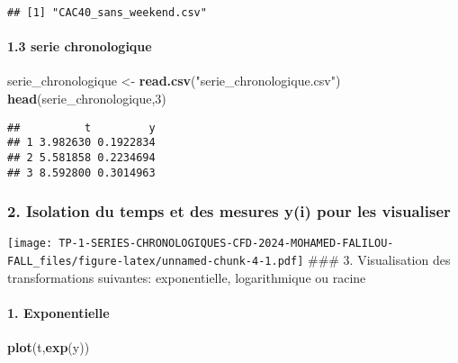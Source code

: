 \documentclass[
]{article}
\newenvironment{Shaded}{\begin{snugshade}}{\end{snugshade}}
\newcommand{\DecValTok}[1]{\textcolor[rgb]{0.00,0.00,0.81}{#1}}
\newcommand{\FunctionTok}[1]{\textcolor[rgb]{0.13,0.29,0.53}{\textbf{#1}}}
\newcommand{\NormalTok}[1]{#1}
\newcommand{\OtherTok}[1]{\textcolor[rgb]{0.56,0.35,0.01}{#1}}
\newcommand{\SpecialCharTok}[1]{\textcolor[rgb]{0.81,0.36,0.00}{\textbf{#1}}}
\newcommand{\StringTok}[1]{\textcolor[rgb]{0.31,0.60,0.02}{#1}}
\begin{document}
\begin{verbatim}
## [1] "CAC40_sans_weekend.csv"
\end{verbatim}

\paragraph{1.3 serie chronologique}\label{serie-chronologique}

\begin{Shaded}
\begin{Highlighting}[]
\NormalTok{serie\_chronologique }\OtherTok{\textless{}{-}} \FunctionTok{read.csv}\NormalTok{(}\StringTok{"serie\_chronologique.csv"}\NormalTok{)}
\FunctionTok{head}\NormalTok{(serie\_chronologique,}\DecValTok{3}\NormalTok{)}
\end{Highlighting}
\end{Shaded}

\begin{verbatim}
##          t         y
## 1 3.982630 0.1922834
## 2 5.581858 0.2234694
## 3 8.592800 0.3014963
\end{verbatim}

\subsubsection{2. Isolation du temps et des mesures y(i) pour les
visualiser}\label{isolation-du-temps-et-des-mesures-yi-pour-les-visualiser}

\begin{Shaded}
\end{Shaded}

\texttt{[image: TP-1-SERIES-CHRONOLOGIQUES-CFD-2024-MOHAMED-FALILOU-FALL\_files/figure-latex/unnamed-chunk-4-1.pdf]}
\#\#\# 3. Visualisation des transformations suivantes: exponentielle,
logarithmique ou racine

\paragraph{1. Exponentielle}\label{exponentielle}

\begin{Shaded}
\begin{Highlighting}[]
\FunctionTok{plot}\NormalTok{(t,}\FunctionTok{exp}\NormalTok{(y))}
\end{Highlighting}
\end{Shaded}
\end{document}
